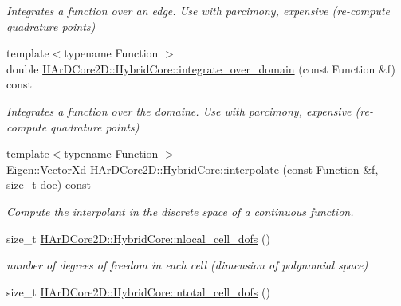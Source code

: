 \begin{DoxyCompactItemize}
\begin{DoxyCompactList}\small\item\em Integrates a function over an edge. Use with parcimony, expensive (re-\/compute quadrature points) \end{DoxyCompactList}\item 
\mbox{\label{group__HybridCore_gab058c4e54d1e33c49e537b8d0f602848}} 
{\footnotesize template$<$typename Function $>$ }\\double \hyperlink{group__HybridCore_gab058c4e54d1e33c49e537b8d0f602848}{H\+Ar\+D\+Core2\+D\+::\+Hybrid\+Core\+::integrate\+\_\+over\+\_\+domain} (const Function \&f) const
\begin{DoxyCompactList}\small\item\em Integrates a function over the domaine. Use with parcimony, expensive (re-\/compute quadrature points) \end{DoxyCompactList}\item 
\mbox{\label{group__HybridCore_ga71c953efc96f467cb24faa1b60ee9bb2}} 
{\footnotesize template$<$typename Function $>$ }\\Eigen\+::\+Vector\+Xd \hyperlink{group__HybridCore_ga71c953efc96f467cb24faa1b60ee9bb2}{H\+Ar\+D\+Core2\+D\+::\+Hybrid\+Core\+::interpolate} (const Function \&f, size\+\_\+t doe) const
\begin{DoxyCompactList}\small\item\em Compute the interpolant in the discrete space of a continuous function. \end{DoxyCompactList}\item 
\mbox{\label{group__HybridCore_ga6faceb46cc896cd6d82a821828518730}} 
size\+\_\+t \hyperlink{group__HybridCore_ga6faceb46cc896cd6d82a821828518730}{H\+Ar\+D\+Core2\+D\+::\+Hybrid\+Core\+::nlocal\+\_\+cell\+\_\+dofs} ()
\begin{DoxyCompactList}\small\item\em number of degrees of freedom in each cell (dimension of polynomial space) \end{DoxyCompactList}\item 
\mbox{\label{group__HybridCore_gaf97e3efcc37ac51074c7136af3ca517b}} 
size\+\_\+t \hyperlink{group__HybridCore_gaf97e3efcc37ac51074c7136af3ca517b}{H\+Ar\+D\+Core2\+D\+::\+Hybrid\+Core\+::ntotal\+\_\+cell\+\_\+dofs} ()

\end{DoxyCompactItemize}

